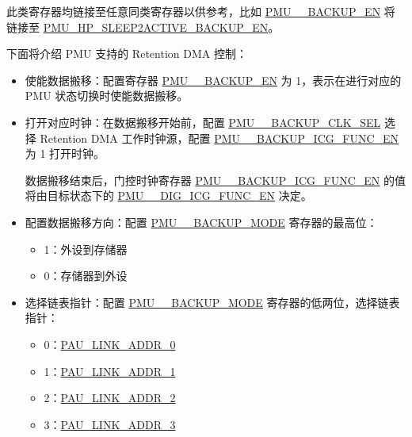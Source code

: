 \documentclass[main\_\_CN.tex]{subfiles}
\begin{document}
此类寄存器均链接至任意同类寄存器以供参考，比如 \hyperref[fielddesc:PMUHPSLEEP2ACTIVEBACKUPEN]{PMU\_\_BACKUP\_EN} 将链接至 \hyperref[fielddesc:PMUHPSLEEP2ACTIVEBACKUPEN]{PMU\_HP\_SLEEP2ACTIVE\_BACKUP\_EN}。

下面将介绍 PMU 支持的 Retention DMA 控制：

\begin{itemize}
    \item 使能数据搬移：配置寄存器 \hyperref[fielddesc:PMUHPSLEEP2ACTIVEBACKUPEN]{PMU\_\_BACKUP\_EN} 为 1，表示在进行对应的 PMU 状态切换时使能数据搬移。
    \item 打开对应时钟：在数据搬移开始前，配置 \hyperref[fielddesc:PMUHPMODEM2ACTIVEBACKUPCLKSEL]{PMU\_\_BACKUP\_CLK\_SEL} 选择 Retention DMA 工作时钟源，配置 \hyperref[fielddesc:PMUHPACTIVEBACKUPICGFUNCEN]{PMU\_\_BACKUP\_ICG\_FUNC\_EN} 为 1 打开时钟。

    数据搬移结束后，门控时钟寄存器 \hyperref[fielddesc:PMUHPACTIVEBACKUPICGFUNCEN]{PMU\_\_BACKUP\_ICG\_FUNC\_EN} 的值将由目标状态下的 \hyperref[fielddesc:PMUHPACTIVEDIGICGFUNCEN]{PMU\_\_DIG\_ICG\_FUNC\_EN} 决定。

    \item 配置数据搬移方向：配置 \hyperref[fielddesc:PMUHPMODEM2ACTIVEBACKUPMODEMCLKCODE]{PMU\_\_BACKUP\_MODE} 寄存器的最高位：
        \begin{itemize}
            \item 1：外设到存储器
            \item 0：存储器到外设
        \end{itemize}

    \item 选择链表指针：配置 \hyperref[fielddesc:PMUHPMODEM2ACTIVEBACKUPMODEMCLKCODE]{PMU\_\_BACKUP\_MODE} 寄存器的低两位，选择链表指针：
        \begin{itemize}
        \item 0：\hyperref[fielddesc:PAULINKADDR0]{PAU\_LINK\_ADDR\_0}
        \item 1：\hyperref[fielddesc:PAULINKADDR1]{PAU\_LINK\_ADDR\_1}
        \item 2：\hyperref[fielddesc:PAULINKADDR2]{PAU\_LINK\_ADDR\_2}
        \item 3：\hyperref[fielddesc:PAULINKADDR3]{PAU\_LINK\_ADDR\_3}
        \end{itemize}
\end{itemize}
\end{document}
